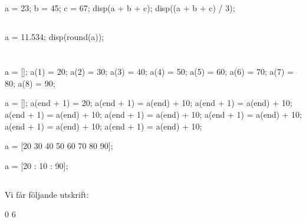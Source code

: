 \subsection*{}
\vspace{3pt}
\begin{matlab}
a = 23;
b = 45;
c = 67;
disp(a + b + c);
disp((a + b + c) / 3);
\end{matlab}

\subsection*{}
\vspace{3pt}
\begin{matlab}
a = 11.534;
disp(round(a));
\end{matlab}

\section*{}

\subsection*{}
\vspace{3pt}
\begin{matlab}
a = [];
a(1) = 20;
a(2) = 30;
a(3) = 40;
a(4) = 50;
a(5) = 60;
a(6) = 70;
a(7) = 80;
a(8) = 90;

a = [];
a(end + 1) = 20;
a(end + 1) = a(end) + 10;
a(end + 1) = a(end) + 10;
a(end + 1) = a(end) + 10;
a(end + 1) = a(end) + 10;
a(end + 1) = a(end) + 10;
a(end + 1) = a(end) + 10;
a(end + 1) = a(end) + 10;

a = [20 30 40 50 60 70 80 90];

a = [20 : 10 : 90];
\end{matlab}

\subsection*{}
Vi får följande utskrift:
\vspace{10pt}
\begin{matlab}
0
6
\end{matlab}



